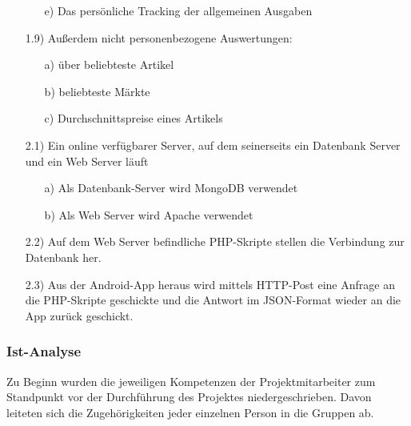 \documentclass[12pt,a4paper]{article}
\begin{document}
\begin{itemize}
\begin{itemize}
\item[e)]Das persönliche Tracking der allgemeinen Ausgaben
\end{itemize}
 \item[1.9)] Außerdem nicht personenbezogene Auswertungen:
 \begin{itemize}
\item[a)]über beliebteste Artikel
\item[b)] beliebteste Märkte
\item[c)] Durchschnittspreise eines Artikels
\end{itemize}
 \item[2.1)] Ein online verfügbarer Server, auf dem seinerseits ein Datenbank Server und ein Web Server läuft
 \begin{itemize}
\item[a)]Als Datenbank-Server wird MongoDB verwendet
\item[b)]Als Web Server wird Apache verwendet
\end{itemize}
\item[2.2)] Auf dem Web Server befindliche PHP-Skripte stellen die Verbindung zur Datenbank her.
\item[2.3)] Aus der Android-App heraus wird mittels HTTP-Post eine Anfrage an die PHP-Skripte geschickte und die Antwort im JSON-Format wieder an die App zurück geschickt.
\end{itemize}
\newpage

\subsubsection{Ist-Analyse}
Zu Beginn wurden die jeweiligen Kompetenzen der Projektmitarbeiter zum Standpunkt vor der Durchführung des Projektes niedergeschrieben. Davon leiteten sich die Zugehörigkeiten jeder einzelnen Person in die Gruppen ab.\\
\newline
\end{document}

